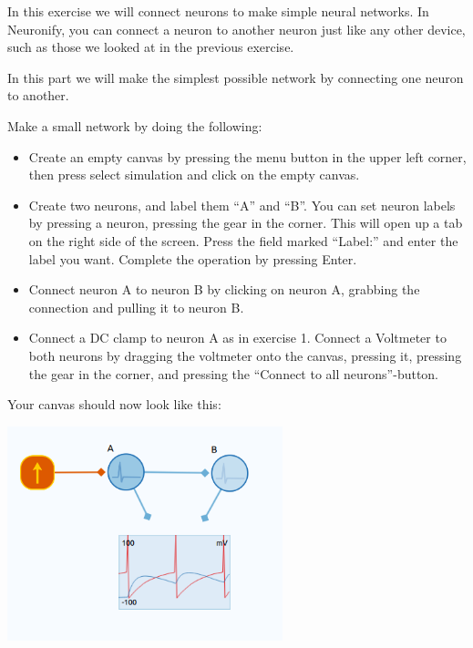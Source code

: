 \begin{Exercise}[title=Small Networks]
In this exercise we will connect neurons to make simple neural networks. In Neuronify, you can connect a neuron to another neuron just like any other device, such as those we looked at in the previous exercise. 

\begin{ExePart}
In this part we will make the simplest possible network by connecting one neuron to another. 

Make a small network by doing the following:
\begin{itemize}
\item Create an empty canvas by pressing the menu button in the upper left corner, then press select simulation and click on the empty canvas.

\item Create two neurons, and label them ``A'' and ``B''. You can set neuron labels by pressing a neuron, pressing the gear in the \gearpos  corner. This will open up a tab on the right side of the screen. Press the field marked ``Label:'' and enter the label you want. Complete the operation by pressing Enter. 

\item Connect neuron A to neuron B by clicking on neuron A, grabbing the connection and pulling it to neuron B. 

\item Connect a DC clamp to neuron A as in exercise 1. Connect a Voltmeter to both neurons by dragging the voltmeter onto the canvas, pressing it, pressing the gear in the \gearpos corner, and pressing the ``Connect to all neurons''-button.
\end{itemize}

Your canvas should now look like this: \\
\begin{center}
\includegraphics[width=8cm]{two_neurons.png}
\end{center}


\end{ExePart}
\end{Exercise}
